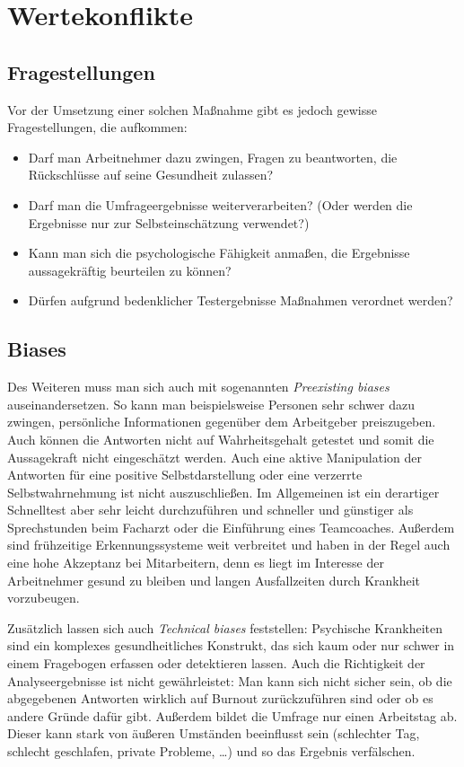 \documentclass[a4paper,12pt,]{article}
\begin{document}
\section{Wertekonflikte}

\subsection{Fragestellungen}
Vor der Umsetzung einer solchen Maßnahme gibt es jedoch gewisse Fragestellungen, die aufkommen: 
\begin{itemize}
\item Darf man Arbeitnehmer dazu zwingen, Fragen zu beantworten, die Rückschlüsse auf seine Gesundheit zulassen?
\item Darf man die Umfrageergebnisse weiterverarbeiten? (Oder werden die Ergebnisse nur zur Selbsteinschätzung verwendet?)
\item Kann man sich die psychologische Fähigkeit anmaßen, die Ergebnisse aussagekräftig beurteilen zu können?
\item Dürfen aufgrund bedenklicher Testergebnisse Maßnahmen verordnet werden?
\end{itemize} 

\subsection{Biases}
Des Weiteren muss man sich auch mit sogenannten \emph{Preexisting biases} auseinandersetzen. So kann man beispielsweise Personen sehr schwer dazu zwingen, persönliche Informationen gegenüber dem Arbeitgeber preiszugeben. Auch können die Antworten nicht auf Wahrheitsgehalt getestet und somit die Aussagekraft nicht eingeschätzt werden. Auch eine aktive Manipulation der Antworten für eine positive Selbstdarstellung oder eine verzerrte Selbstwahrnehmung ist nicht auszuschließen. Im Allgemeinen ist ein derartiger Schnelltest aber sehr leicht durchzuführen und schneller und günstiger als Sprechstunden beim Facharzt oder die Einführung eines Teamcoaches. Außerdem sind frühzeitige Erkennungssysteme weit verbreitet und haben in der Regel auch eine hohe Akzeptanz bei Mitarbeitern, denn es liegt im Interesse der Arbeitnehmer gesund zu bleiben und langen Ausfallzeiten durch Krankheit vorzubeugen.

Zusätzlich lassen sich auch \emph{Technical biases} feststellen: Psychische Krankheiten sind ein komplexes gesundheitliches Konstrukt, das sich kaum oder nur schwer in einem Fragebogen erfassen oder detektieren lassen. Auch die Richtigkeit der Analyseergebnisse ist nicht gewährleistet: Man kann sich nicht sicher sein, ob die abgegebenen Antworten wirklich auf Burnout zurückzuführen sind oder ob es andere Gründe dafür gibt. Außerdem bildet die Umfrage nur einen Arbeitstag ab. Dieser kann stark von äußeren Umständen beeinflusst sein (schlechter Tag, schlecht geschlafen, private Probleme, …) und so das Ergebnis verfälschen.
\end{document}
